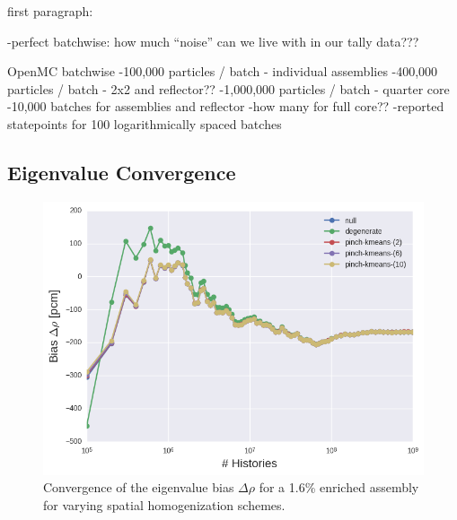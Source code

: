 first paragraph:

-perfect batchwise: how much ``noise'' can we live with in our tally data???

OpenMC batchwise
-100,000 particles / batch - individual assemblies
-400,000 particles / batch - 2x2 and reflector??
-1,000,000 particles / batch - quarter core
-10,000 batches for assemblies and reflector
-how many for full core??
-reported statepoints for 100 logarithmically spaced batches

\subsection{Eigenvalue Convergence}
\label{subsec:chap11-eigenvalue-converge}

\clearpage

\begin{figure}[h!]
\centering
\includegraphics[width=0.85\linewidth]{figures/results/assm-16/no-transform/keff-bias}
\vspace{2mm}
\caption[Eigenvalue bias covergence for a 1.6\% enriched assembly]{Convergence of the eigenvalue bias $\Delta\rho$ for a 1.6\% enriched assembly for varying spatial homogenization schemes.}
\label{fig:chap11-assm-1.6-eigenvalue-converge}
\end{figure}

